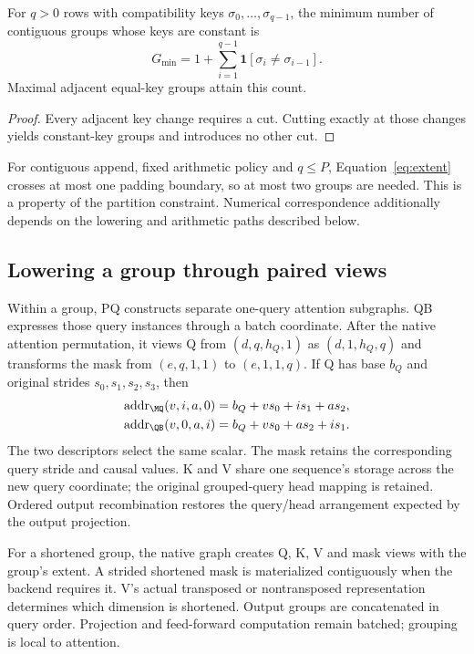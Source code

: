 \begin{proposition}
For $q>0$ rows with compatibility keys $\sigma_0,\ldots,\sigma_{q-1}$, the minimum number of contiguous groups whose keys are constant is
\begin{equation}
G_{\min}=1+\sum_{i=1}^{q-1}\mathbf{1}[\sigma_i\ne\sigma_{i-1}].
\label{eq:groups}
\end{equation}
Maximal adjacent equal-key groups attain this count.
\end{proposition}
\begin{proof}
Every adjacent key change requires a cut. Cutting exactly at those changes yields constant-key groups and introduces no other cut.
\end{proof}
For contiguous append, fixed arithmetic policy and $q\leq P$, Equation~\eqref{eq:extent} crosses at most one padding boundary, so at most two groups are needed. This is a property of the partition constraint. Numerical correspondence additionally depends on the lowering and arithmetic paths described below.

\subsection{Lowering a group through paired views}
Within a group, PQ constructs separate one-query attention subgraphs. QB expresses those query instances through a batch coordinate. After the native attention permutation, it views Q from $(d,q,h_Q,1)$ as $(d,1,h_Q,q)$ and transforms the mask from $(e,q,1,1)$ to $(e,1,1,q)$. If Q has base $b_Q$ and original strides $s_0,s_1,s_2,s_3$, then
\begin{align}
\operatorname{addr}_{\MQ}(v,i,a,0)&=b_Q+v s_0+i s_1+a s_2,\\
\operatorname{addr}_{\QB}(v,0,a,i)&=b_Q+v s_0+a s_2+i s_1.
\end{align}
The two descriptors select the same scalar. The mask retains the corresponding query stride and causal values. K and V share one sequence's storage across the new query coordinate; the original grouped-query head mapping is retained. Ordered output recombination restores the query/head arrangement expected by the output projection.

For a shortened group, the native graph creates Q, K, V and mask views with the group's extent. A strided shortened mask is materialized contiguously when the backend requires it. V's actual transposed or nontransposed representation determines which dimension is shortened. Output groups are concatenated in query order. Projection and feed-forward computation remain batched; grouping is local to attention.


